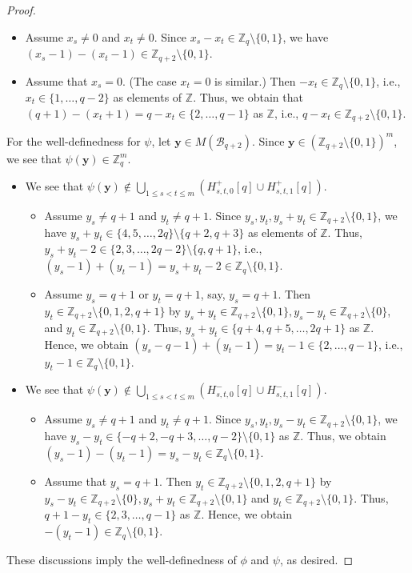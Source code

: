 \documentclass[10pt,a4paper]{amsart}
\newcommand{\Bc}{\mathcal{B}}
\newcommand{\ZZ}{\mathbb{Z}}
\begin{document}
\begin{proof}
\begin{itemize}
    \begin{itemize}
        \item Assume $x_s \neq 0$ and $x_t \neq 0$. 
        Since $x_s - x_t \in \ZZ_q \setminus \{0,1\}$, we have $(x_s - 1) - (x_t - 1) \in \ZZ_{q+2} \setminus \{0,1\}$. 
        \item Assume that $x_s = 0$. (The case $x_t=0$ is similar.) 
        Then $-x_t \in \ZZ_q \setminus \{0,1\}$, i.e., $x_t \in \{1,\ldots,q-2\}$ as elements of $\ZZ$. 
        Thus, we obtain that $(q+1) - (x_t + 1) = q - x_t \in \{2,\ldots,q-1\}$ as $\ZZ$, i.e., $q-x_t \in \ZZ_{q+2} \setminus \{0,1\}$.  
    \end{itemize}
\end{itemize}

\medskip

\noindent
For the well-definedness for $\psi$, let $\bm{y} \in M(\Bc_{q+2})$.
Since $\bm{y} \in (\ZZ_{q+2} \setminus \{0,1\})^m$, we see that $\psi(\bm{y}) \in \ZZ_q^m$.   
\begin{itemize}
\item We see that $\psi(\bm{y}) \notin \bigcup_{1 \leq s<t \leq m}(H_{s,t,0}^+[q] \cup H_{s,t,1}^+[q])$.
    \begin{itemize}
        \item Assume $y_s \neq q+1$ and $y_t \neq q+1$. Since $y_s,y_t,y_s+y_t \in \ZZ_{q+2} \setminus \{0,1\}$, 
        we have $y_s + y_t \in \{4,5,\ldots,2q\} \setminus \{q+2,q+3\}$ as elements of $\ZZ$. 
        Thus, $y_s + y_t - 2 \in \{2,3,\ldots,2q-2\} \setminus \{q,q+1\}$, i.e., $(y_s-1)+(y_t-1)=y_s + y_t - 2 \in \ZZ_q \setminus \{0,1\}$. 
        \item Assume $y_s=q+1$ or $y_t=q+1$, say, $y_s=q + 1$. Then $y_t \in \ZZ_{q+2} \setminus \{0,1,2,q+1\}$ by $y_s+y_t \in \ZZ_{q+2} \setminus \{0,1\}, y_s - y_t \in \ZZ_{q+2} \setminus \{0\}$, and $y_t \in \ZZ_{q+2} \setminus \{0,1\}$. 
        Thus, $y_s + y_t \in \{q+4,q+5,\ldots,2q+1\}$ as $\ZZ$. Hence, we obtain $(y_s-q-1)+(y_t - 1)=y_t-1 \in \{2,\ldots,q-1\}$, 
        i.e., $y_t-1 \in \ZZ_q \setminus \{0,1\}$. 
    \end{itemize}
\item We see that $\psi(\bm{y}) \notin \bigcup_{1 \leq s<t \leq m}(H_{s,t,0}^-[q] \cup H_{s,t,1}^-[q])$.
    \begin{itemize}
        \item Assume $y_s \neq q+1$ and $y_t \neq q+1$. Since $y_s,y_t,y_s - y_t \in \ZZ_{q+2} \setminus \{0,1\}$, 
        we have $y_s-y_t \in \{-q+2,-q+3,\ldots,q-2\} \setminus \{0,1\}$ as $\ZZ$. 
        Thus, we obtain $(y_s -1) - (y_t - 1) =y_s-y_t \in \ZZ_q \setminus \{0,1\}$. 
        \item Assume that $y_s = q+1$. %
        Then $y_t \in \ZZ_{q+2} \setminus \{0,1,2,q+1\}$ by $y_s - y_t \in \ZZ_{q+2} \setminus \{0\}, y_s + y_t \in \ZZ_{q+2} \setminus \{0,1\}$ and $y_t \in \ZZ_{q+2} \setminus \{0,1\}$. Thus, $q+1 - y_t \in \{2,3,\ldots,q-1\}$ as $\ZZ$. 
        Hence, we obtain $-(y_t - 1) \in \ZZ_q \setminus\{0,1\}$.
    \end{itemize}
\end{itemize}

These discussions imply the well-definedness of $\phi$ and $\psi$, as desired. 
\end{proof}
\end{document}
